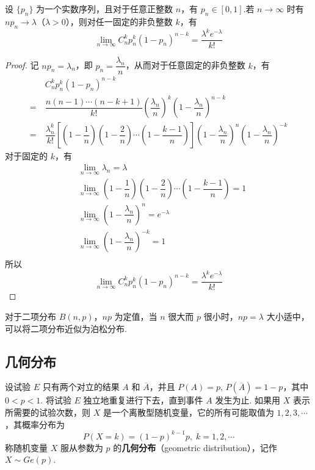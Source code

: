 \begin{theorem}[][泊松定理]
    \indent 设 $\{ p_n \}$ 为一个实数序列，且对于任意正整数 $n$，有 $p_n \in [0,1]$.若 $n \to \infty$ 时有 $n p_n \to \lambda$（$\lambda > 0$），则对任一固定的非负整数 $k$，有
    $$
    \lim_{n\to\infty} C_n^k p_n^k (1-p_n)^{n-k} = \dfrac{\lambda^k e^{-\lambda}}{k!}
    $$
\end{theorem}

\begin{proof}
    记 $n p_n=\lambda_n$，即 $p_n=\dfrac{\lambda_n}{n}$，从而对于任意固定的非负整数 $k$，有
    $$
    \begin{aligned}
        & C_n^k p_n^k (1-p_n)^{n-k} \\
        =\ & \dfrac{n(n-1) \cdots (n-k+1)}{k!} \left( \dfrac{\lambda_n}{n} \right)^k \left( 1-\dfrac{\lambda_n}{n} \right)^{n-k} \\
        =\ & \dfrac{\lambda_n^k}{k!} \left[ \left( 1-\dfrac{1}{n} \right) \left( 1-\dfrac{2}{n} \right) \cdots \left( 1-\dfrac{k-1}{n} \right) \right] \left( 1-\dfrac{\lambda_n}{n} \right)^n \left( 1-\dfrac{\lambda_n}{n} \right)^{-k}
    \end{aligned}
    $$
    对于固定的 $k$，有
    $$
    \begin{aligned}
        & \lim_{n \to \infty} \lambda_n = \lambda \\
        & \lim_{n \to \infty} \left( 1-\dfrac{1}{n} \right) \left( 1-\dfrac{2}{n} \right) \cdots \left( 1-\dfrac{k-1}{n} \right) = 1 \\
        & \lim_{n \to \infty} \left( 1-\dfrac{\lambda_n}{n} \right)^n = e^{-\lambda} \\
        & \lim_{n \to \infty} \left( 1-\dfrac{\lambda_n}{n} \right)^{-k} = 1 \\
    \end{aligned}
    $$
    所以
    $$
    \lim_{n\to\infty} C_n^k p_n^k (1-p_n)^{n-k} = \dfrac{\lambda^k e^{-\lambda}}{k!}
    $$

    \vspace{-1.5em}
\end{proof}

对于二项分布 $B(n,p)$，$np$ 为定值，当 $n$ 很大而 $p$ 很小时，$np = \lambda$ 大小适中，可以将二项分布近似为泊松分布.

\subsection{几何分布}

设试验 $E$ 只有两个对立的结果 $A$ 和 $\overline{A}$，并且 $P(A)=p, \, P(\overline{A})=1-p$，其中 $0<p<1$. 将试验 $E$ 独立地重复进行下去，直到事件 $A$ 发生为止. 如果用 $X$ 表示所需要的试验次数，则 $X$ 是一个离散型随机变量，它的所有可能取值为 $1,2,3,\cdots$，其概率分布为
$$
P(X=k) = (1-p)^{k-1} p, \; k=1,2,\cdots
$$
称随机变量 $X$ 服从参数为 $p$ 的\textbf{几何分布}（geometric distribution），记作 $X \sim Ge(p)$.

